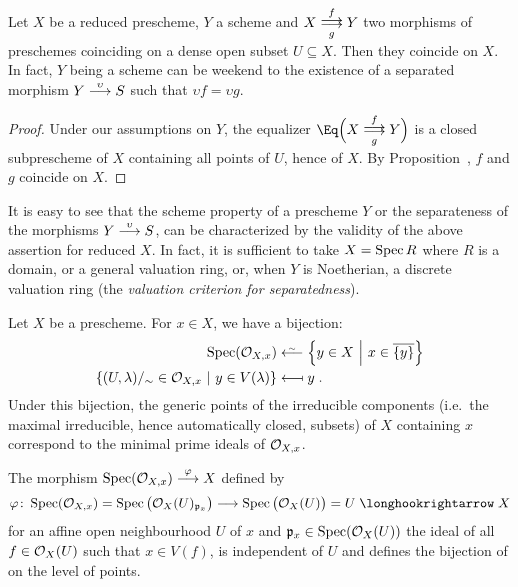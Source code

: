 \documentclass[a4paper,parskip=half,numbers=enddot, DIV=12]{scrreprt}
\begin{document}
\begin{fact}
    Let $X$ be a reduced prescheme, $Y$ a scheme and $X\doublemorphism[f][g] Y$ two morphisms of preschemes coinciding on a dense open subset $U\subseteq X$. Then they coincide on $X$. In fact, $Y$ being a scheme can be weekend to the existence of a separated morphism $Y\morphism[\upsilon] S$ such that $\upsilon f = \upsilon g$.
\end{fact}
\begin{proof}
    Under our assumptions on $Y$, the equalizer $\Eq\Big(X\doublemorphism[f][g] Y\Big)$ is a closed subprescheme of $X$ containing all points of $U$, hence of $X$. By Proposition~, $f$ and $g$ coincide on $X$.
\end{proof}
\begin{rem}
    It is easy to see that the scheme property of a prescheme $Y$ or the separateness of the morphisms $Y\morphism[\upsilon] S$, can be characterized by the validity of the above assertion for reduced $X$. In fact, it is sufficient to take $X=\operatorname{Spec} R$ where $R$ is a domain, or a general valuation ring, or, when $Y$ is Noetherian, a discrete valuation ring (the \emph{valuation criterion for separatedness}).
\end{rem}
\begin{prop}
    \begin{alphanumerate}
    \item{}
        Let $X$ be a prescheme. For $x\in X$, we have a bijection:
        \begin{align*}
            \Spec(\Oo_{X,x}) &\lisomorphism \left\{y\in X\st x\in \ov{\{y\}}\right\}\\
            \left\{(U,\lambda)/_\sim \in \Oo_{X,x}\st y\in V(\lambda)\right\} &\longmapsfrom y\;.
        \end{align*}
        Under this bijection, the generic points of the irreducible components (i.e.\ the maximal irreducible, hence automatically closed, subsets) of $X$ containing $x$ correspond to the minimal prime ideals of $\mathcal{O}_{X,x}$.
    \item
        The morphism $\Spec (\Oo_{X,x}) \morphism[\phi] X$ defined by 
        \begin{align*}
            \phi\colon\Spec(\Oo_{X,x} ) = \Spec\big(\Oo_X(U)_{\pp_x}\big) \morphism \Spec\big(\Oo_X(U)\big) = U \monomorphism X
        \end{align*}
        for an affine open neighbourhood $U$ of $x$ and $\mathfrak{p}_x\in \operatorname{Spec}(\mathcal{O}_X(U))$ the ideal of all $f\in \mathcal{O}_X(U)$ such that $x\in V(f)$, is independent of $U$ and defines the bijection of  on the level of points.
    \end{alphanumerate}
\end{prop}
\end{document}
